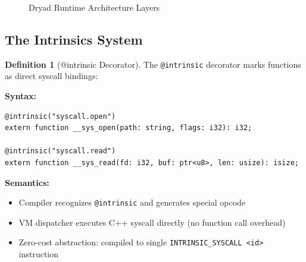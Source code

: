 \documentclass[12pt,a4paper]{article}
\theoremstyle{definition}
\newtheorem{definition}{Definition}[section]
\begin{document}
\begin{figure}[h]
\centering
{}
\caption{Dryad Runtime Architecture Layers}
\end{figure}

\subsection{The Intrinsics System}

\begin{definition}[@intrinsic Decorator]
The \texttt{@intrinsic} decorator marks functions as direct syscall bindings:

\textbf{Syntax:}
\begin{lstlisting}[language=Dryad]
@intrinsic("syscall.open")
extern function __sys_open(path: string, flags: i32): i32;

@intrinsic("syscall.read")
extern function __sys_read(fd: i32, buf: ptr<u8>, len: usize): isize;
\end{lstlisting}

\textbf{Semantics:}
\begin{itemize}[leftmargin=*]
    \item Compiler recognizes \texttt{@intrinsic} and generates special opcode
    \item VM dispatcher executes C++ syscall directly (no function call overhead)
    \item Zero-cost abstraction: compiled to single \texttt{INTRINSIC\_SYSCALL <id>} instruction
\end{itemize}
\end{definition}
\end{document}
